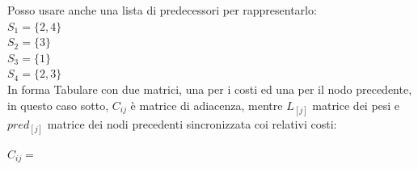 \documentclass{article}
\begin{document}
\begin{center}
\end{center}
Posso usare anche una lista di predecessori per rappresentarlo:\\
$S_1 = \{2,4\}$\\
$S_2 = \{3\}$\\
$S_3 = \{1\}$\\
$S_4 = \{2,3\}$\\
In forma Tabulare con due matrici, una per i  costi ed una per il nodo precedente, in questo caso sotto, $C_{ij}$ è matrice di adiacenza, mentre $L_[j]$ matrice dei pesi e $pred_[j]$ matrice dei nodi precedenti sincronizzata coi relativi costi:\\
\begin{center}
$C_{ij}=$
\end{center}
\end{document}
